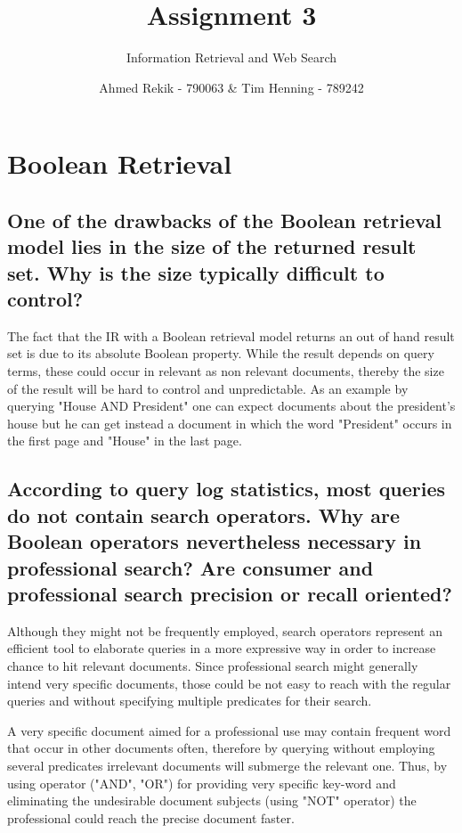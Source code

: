 \documentclass{scrartcl}
\title{Assignment 3}
\subtitle{Information Retrieval and Web Search}
\author{Ahmed Rekik - 790063 \& Tim Henning - 789242}
\begin{document}
\maketitle

\section{Boolean Retrieval}

\subsection{One of the drawbacks of the Boolean retrieval model lies in the size of the returned result
set. Why is the size typically difficult to control? }

The fact that the IR with a Boolean retrieval model returns an out of hand result set is due to its absolute Boolean property. While the result depends on query terms, these could occur in relevant as non relevant documents, thereby the size of the result will be hard to control and unpredictable. As an example by querying "House AND President" one can expect documents about the president's house but he can get instead a document in which the word "President" occurs in the first page and "House" in the last page.


\subsection{According to query log statistics, most queries do not contain search operators. Why are
Boolean operators nevertheless necessary in professional search? Are consumer and professional
search precision or recall oriented? }

Although they might not be frequently employed, search operators represent an efficient tool to elaborate queries in a more expressive way in order to increase chance to hit relevant documents. Since professional search might generally intend very specific documents, those could be not easy to reach with the regular queries and without specifying multiple predicates for their search.

A very specific document aimed for a professional use may contain frequent word that occur in other documents often, therefore by querying without employing several predicates irrelevant documents will submerge the relevant one. Thus, by using operator ("AND", "OR") for providing very specific key-word and eliminating the undesirable document subjects (using "NOT" operator) the professional could reach the precise document faster.
\end{document}
